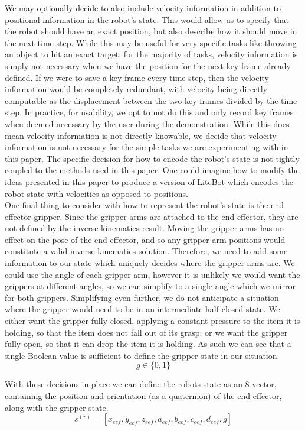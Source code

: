 We may optionally decide to also include velocity information in addition to positional information in the robot's state. This would allow us to specify that the robot should have an exact position, but also describe how it should move in the next time step. While this may be useful for very specific tasks like throwing an object to hit an exact target; for the majority of tasks, velocity information is simply not necessary when we have the position for the next key frame already defined. If we were to save a key frame every time step, then the velocity information would be completely redundant, with velocity being directly computable as the displacement between the two key frames divided by the time step. In practice, for usability, we opt to not do this and only record key frames when deemed necessary by the user during the demonstration. While this does mean velocity information is not directly knowable, we decide that velocity information is not necessary for the simple tasks we are experimenting with in this paper. The specific decision for how to encode the robot's state is not tightly coupled to the methods used in this paper. One could imagine how to modify the ideas presented in this paper to produce a version of LiteBot which encodes the robot state with velocities as opposed to positions.\\

One final thing to consider with how to represent the robot's state is the end effector gripper. Since the gripper arms are attached to the end effector, they are not defined by the inverse kinematics result. Moving the gripper arms has no effect on the pose of the end effector, and so any gripper arm positions would constitute a valid inverse kinematics solution. Therefore, we need to add some information to our state which uniquely decides where the gripper arms are. We could use the angle of each gripper arm, however it is unlikely we would want the grippers at different angles, so we can simplify to a single angle which we mirror for both grippers. Simplifying even further, we do not anticipate a situation where the gripper would need to be in an intermediate half closed state. We either want the gripper fully closed, applying a constant pressure to the item it is holding, so that the item does not fall out of its grasp; or we want the gripper fully open, so that it can drop the item it is holding. As such we can see that a single Boolean value is sufficient to define the gripper state in our situation.
$$g \in \{0,1\}$$

With these decisions in place we can define the robots state as an 8-vector, containing the position and orientation (as a quaternion) of the end effector, along with the gripper state. 
$$s^{(r)} = [x_{eef}, y_{eef}, z_{eef}, a_{eef}, b_{eef}, c_{eef}, d_{eef}, g]$$

